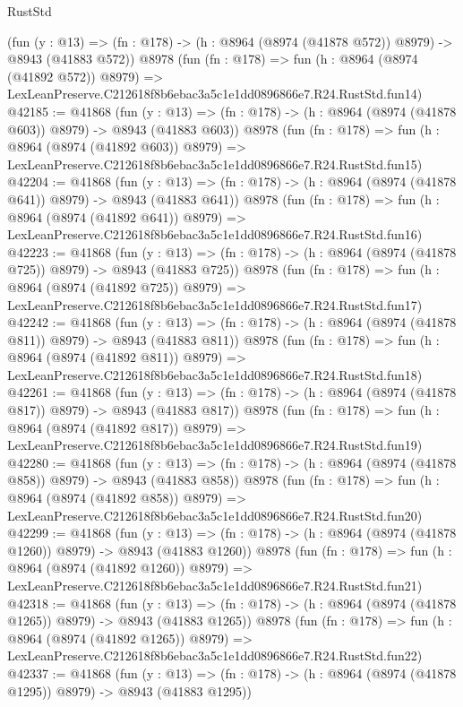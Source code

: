 \begin{lexlean}{RustStd}
\begin{coremodule}
    (fun (y : @13) => (fn : @178) -> (h : @8964 (@8974 (@41878 @572)) @8979) -> @8943 (@41883 @572))
    @8978
    (fun (fn : @178) =>
    fun (h : @8964 (@8974 (@41892 @572)) @8979) =>
    LexLeanPreserve.C212618f8b6ebac3a5c1e1dd0896866e7.R24.RustStd.fun14)
@42185 := @41868
    (fun (y : @13) => (fn : @178) -> (h : @8964 (@8974 (@41878 @603)) @8979) -> @8943 (@41883 @603))
    @8978
    (fun (fn : @178) =>
    fun (h : @8964 (@8974 (@41892 @603)) @8979) =>
    LexLeanPreserve.C212618f8b6ebac3a5c1e1dd0896866e7.R24.RustStd.fun15)
@42204 := @41868
    (fun (y : @13) => (fn : @178) -> (h : @8964 (@8974 (@41878 @641)) @8979) -> @8943 (@41883 @641))
    @8978
    (fun (fn : @178) =>
    fun (h : @8964 (@8974 (@41892 @641)) @8979) =>
    LexLeanPreserve.C212618f8b6ebac3a5c1e1dd0896866e7.R24.RustStd.fun16)
@42223 := @41868
    (fun (y : @13) => (fn : @178) -> (h : @8964 (@8974 (@41878 @725)) @8979) -> @8943 (@41883 @725))
    @8978
    (fun (fn : @178) =>
    fun (h : @8964 (@8974 (@41892 @725)) @8979) =>
    LexLeanPreserve.C212618f8b6ebac3a5c1e1dd0896866e7.R24.RustStd.fun17)
@42242 := @41868
    (fun (y : @13) => (fn : @178) -> (h : @8964 (@8974 (@41878 @811)) @8979) -> @8943 (@41883 @811))
    @8978
    (fun (fn : @178) =>
    fun (h : @8964 (@8974 (@41892 @811)) @8979) =>
    LexLeanPreserve.C212618f8b6ebac3a5c1e1dd0896866e7.R24.RustStd.fun18)
@42261 := @41868
    (fun (y : @13) => (fn : @178) -> (h : @8964 (@8974 (@41878 @817)) @8979) -> @8943 (@41883 @817))
    @8978
    (fun (fn : @178) =>
    fun (h : @8964 (@8974 (@41892 @817)) @8979) =>
    LexLeanPreserve.C212618f8b6ebac3a5c1e1dd0896866e7.R24.RustStd.fun19)
@42280 := @41868
    (fun (y : @13) => (fn : @178) -> (h : @8964 (@8974 (@41878 @858)) @8979) -> @8943 (@41883 @858))
    @8978
    (fun (fn : @178) =>
    fun (h : @8964 (@8974 (@41892 @858)) @8979) =>
    LexLeanPreserve.C212618f8b6ebac3a5c1e1dd0896866e7.R24.RustStd.fun20)
@42299 := @41868
    (fun (y : @13) =>
    (fn : @178) -> (h : @8964 (@8974 (@41878 @1260)) @8979) -> @8943 (@41883 @1260))
    @8978
    (fun (fn : @178) =>
    fun (h : @8964 (@8974 (@41892 @1260)) @8979) =>
    LexLeanPreserve.C212618f8b6ebac3a5c1e1dd0896866e7.R24.RustStd.fun21)
@42318 := @41868
    (fun (y : @13) =>
    (fn : @178) -> (h : @8964 (@8974 (@41878 @1265)) @8979) -> @8943 (@41883 @1265))
    @8978
    (fun (fn : @178) =>
    fun (h : @8964 (@8974 (@41892 @1265)) @8979) =>
    LexLeanPreserve.C212618f8b6ebac3a5c1e1dd0896866e7.R24.RustStd.fun22)
@42337 := @41868
    (fun (y : @13) =>
    (fn : @178) -> (h : @8964 (@8974 (@41878 @1295)) @8979) -> @8943 (@41883 @1295))

\end{coremodule}
\end{lexlean}
